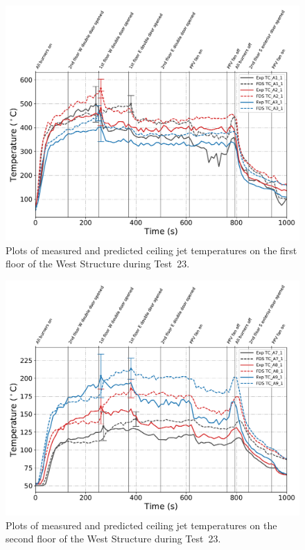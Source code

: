 \begin{figure}[!h]
	\centering
	\includegraphics[width=\columnwidth]{Figures/Plots/Validation/Temperature/Test_23_cjet_1}
	\caption[Plots of measured and predicted ceiling jet temperatures on the first floor during Test~23.]{Plots of measured and predicted ceiling jet temperatures on the first floor of the West Structure during Test~23.}
	\label{fig:cjet1_data_Test23}
\end{figure}

\begin{figure}[!h]
	\centering
	\includegraphics[width=\columnwidth]{Figures/Plots/Validation/Temperature/Test_23_cjet_2}
	\caption[Plots of measured and predicted ceiling jet temperatures on the second floor during Test~23.]{Plots of measured and predicted ceiling jet temperatures on the second floor of the West Structure during Test~23.}
	\label{fig:cjet2_data_Test23}
\end{figure}

